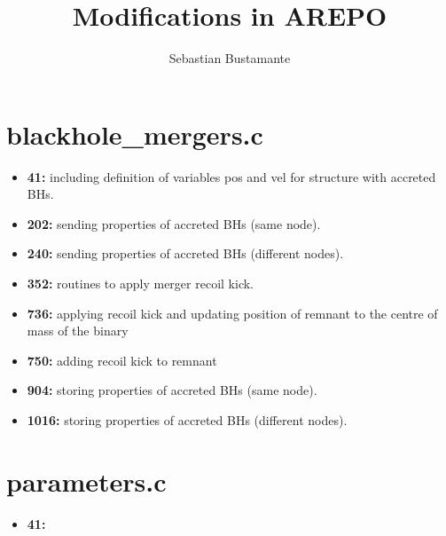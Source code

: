 \documentclass[a4,useAMS,usenatbib,usegraphicx,12pt]{article}
\title{Modifications in AREPO}
\author{Sebastian Bustamante}
\date{}
\begin{document}
\maketitle

\section*{blackhole\_mergers.c}

\begin{itemize}
 \item \textbf{41:} including definition of variables pos and vel for structure with accreted BHs.
 \item \textbf{202:} sending properties of accreted BHs (same node).
 \item \textbf{240:} sending properties of accreted BHs (different nodes).
 \item \textbf{352:} routines to apply merger recoil kick.
 \item \textbf{736:} applying recoil kick and updating position of remnant to the centre of mass 
 of the binary
 \item \textbf{750:} adding recoil kick to remnant
 \item \textbf{904:} storing properties of accreted BHs (same node).
 \item \textbf{1016:} storing properties of accreted BHs (different nodes).
\end{itemize}


\section*{parameters.c}

\begin{itemize}
 \item \textbf{41:} 
\end{itemize}
\end{document}
